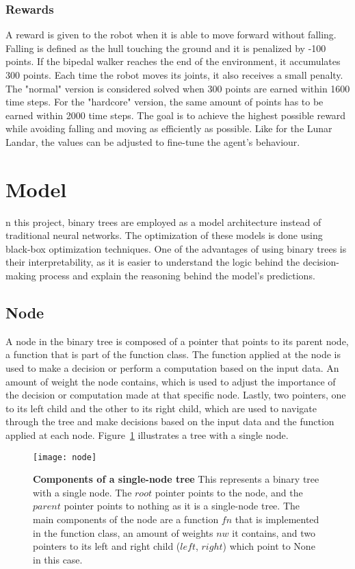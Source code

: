 \subsubsection{Rewards}
A reward is given to the robot when it is able to move forward without falling. Falling is defined as the hull touching the ground and it is penalized by -100 points. If the bipedal walker reaches the end of the environment, it accumulates 300 points. Each time the robot moves its joints, it also receives a small penalty. The "normal" version is considered solved when 300 points are earned within 1600 time steps. For the "hardcore" version, the same amount of points has to be earned within 2000 time steps. The goal is to achieve the highest possible reward while avoiding falling and moving as efficiently as possible. Like for the Lunar Landar, the values can be adjusted to fine-tune the agent's behaviour.


\section{Model}
n this project, binary trees are employed as a model architecture instead of traditional neural networks. The optimization of these models is done using black-box optimization techniques. One of the advantages of using binary trees is their interpretability, as it is easier to understand the logic behind the decision-making process and explain the reasoning behind the model's predictions.
\subsection{Node}
A node in the binary tree is composed of a pointer that points to its parent node, a function that is part of the function class. The function applied at the node is used to make a decision or perform a computation based on the input data. An amount of weight the node contains, which is used to adjust the importance of the decision or computation made at that specific node. Lastly, two pointers, one to its left child and the other to its right child, which are used to navigate through the tree and make decisions based on the input data and the function applied at each node. Figure~\ref{fig:node_composition} illustrates a tree with a single node.
\begin{figure}[!ht]
\centering
\texttt{[image: node]}

\caption[Components of a single-node tree]{
  \textbf{Components of a single-node tree}
This represents a binary tree with a single node. The $root$ pointer points to the node, and the $parent$ pointer points to nothing as it is a single-node tree. The main components of the node are a function $fn$ that is implemented in the function class, an amount of weights $nw$ it contains, and two pointers to its left and right child ($left$, $right$) which point to None in this case.
 }
\label{fig:node_composition}
\end{figure}

